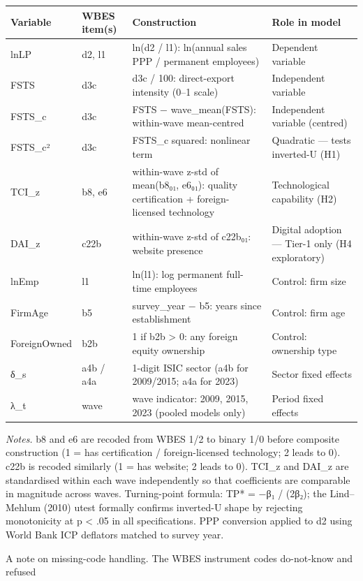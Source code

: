 \documentclass[12pt,a4paper]{article}
\begin{document}
\begin{longtable}[]{@{}llll@{}}
\toprule\noalign{}
Variable & WBES item(s) & Construction & Role in model \\
\midrule\noalign{}
\endhead
\bottomrule\noalign{}
\endlastfoot
lnLP & d2, l1 & ln(d2 / l1): ln(annual sales PPP / permanent employees)
& Dependent variable \\
FSTS & d3c & d3c / 100: direct-export intensity (0--1 scale) &
Independent variable \\
FSTS\_c & d3c & FSTS − wave\_mean(FSTS): within-wave mean-centred &
Independent variable (centred) \\
FSTS\_c² & d3c & FSTS\_c squared: nonlinear term & Quadratic --- tests
inverted-U (H1) \\
TCI\_z & b8, e6 & within-wave z-std of mean(b8₀₁, e6₀₁): quality
certification + foreign-licensed technology & Technological capability
(H2) \\
DAI\_z & c22b & within-wave z-std of c22b₀₁: website presence & Digital
adoption --- Tier-1 only (H4 exploratory) \\
lnEmp & l1 & ln(l1): log permanent full-time employees & Control: firm
size \\
FirmAge & b5 & survey\_year − b5: years since establishment & Control:
firm age \\
ForeignOwned & b2b & 1 if b2b \textgreater{} 0: any foreign equity
ownership & Control: ownership type \\
δ\_s & a4b / a4a & 1-digit ISIC sector (a4b for 2009/2015; a4a for 2023)
& Sector fixed effects \\
λ\_t & wave & wave indicator: 2009, 2015, 2023 (pooled models only) &
Period fixed effects \\
\end{longtable}

\emph{Notes.} b8 and e6 are recoded from WBES 1/2 to binary 1/0 before
composite construction (1 = has certification / foreign-licensed
technology; 2 leads to 0). c22b is recoded similarly (1 = has website; 2
leads to 0). TCI\_z and DAI\_z are standardised within each wave
independently so that coefficients are comparable in magnitude across
waves. Turning-point formula: TP* = −β₁ / (2β₂); the Lind--Mehlum (2010)
utest formally confirms inverted-U shape by rejecting monotonicity at p
\textless{} .05 in all specifications. PPP conversion applied to d2
using World Bank ICP deflators matched to survey year.

A note on missing-code handling. The WBES instrument codes do-not-know
and refused
\end{document}
